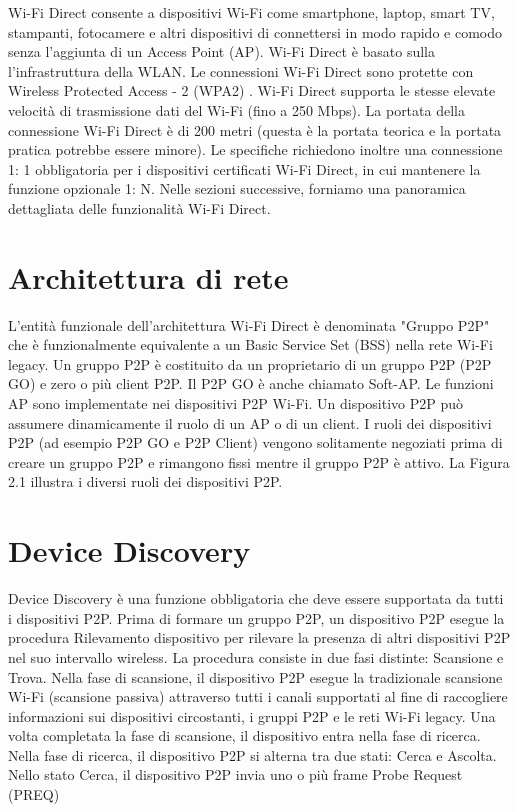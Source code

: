 Wi-Fi Direct consente a dispositivi Wi-Fi come smartphone, laptop, smart TV, 
stampanti, fotocamere e altri dispositivi di connettersi in modo rapido e
comodo senza 
l'aggiunta di un Access Point (AP). Wi-Fi Direct è basato sulla
l'infrastruttura 
della WLAN. Le connessioni Wi-Fi Direct sono protette 
con Wireless Protected Access - 2 (WPA2) \cite{mathews2007evolution}.
Wi-Fi Direct supporta le stesse elevate velocità di trasmissione dati del Wi-Fi
(fino a 250 Mbps).
La portata della connessione Wi-Fi Direct è di 200 metri (questa è la portata
teorica e la portata
pratica potrebbe essere minore). Le specifiche richiedono inoltre una
connessione 
1: 1 obbligatoria per i dispositivi certificati Wi-Fi Direct, in cui mantenere
la funzione 
opzionale 1: N. Nelle sezioni successive, 
forniamo una panoramica dettagliata delle funzionalità Wi-Fi Direct.



\section{Architettura di rete}



L'entità funzionale dell'architettura Wi-Fi Direct è denominata 
"Gruppo P2P" che è funzionalmente equivalente a un Basic Service Set
(BSS) nella rete Wi-Fi legacy. Un gruppo P2P è costituito da un proprietario
di un gruppo P2P (P2P GO) e zero o più client P2P. Il P2P GO
è anche chiamato Soft-AP. Le funzioni AP sono implementate nei dispositivi P2P
Wi-Fi. 
Un dispositivo P2P può assumere dinamicamente il ruolo di un AP o di un client.
I ruoli
dei dispositivi P2P (ad esempio P2P GO e P2P Client) vengono solitamente
negoziati prima
di creare un gruppo P2P e rimangono fissi mentre il gruppo P2P è attivo. La
Figura 2.1 illustra
i diversi ruoli dei dispositivi P2P.



\section{Device Discovery}




Device Discovery è una funzione obbligatoria che deve essere supportata
da tutti i dispositivi P2P. Prima di formare un gruppo P2P, un dispositivo 
P2P esegue la procedura Rilevamento dispositivo per rilevare la presenza di
altri dispositivi P2P nel suo intervallo wireless. La procedura consiste in
due fasi distinte: Scansione e Trova. Nella fase di scansione, il dispositivo
P2P esegue la tradizionale scansione Wi-Fi (scansione passiva) attraverso 
tutti i canali supportati al fine di raccogliere informazioni sui dispositivi 
circostanti, i gruppi P2P e le reti Wi-Fi legacy. Una volta completata la
fase di scansione, il dispositivo entra nella fase di ricerca. Nella 
fase di ricerca, il dispositivo P2P si alterna tra due stati: Cerca
e Ascolta. Nello stato Cerca, il dispositivo P2P invia uno o più 
frame Probe Request (PREQ)

